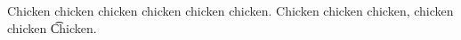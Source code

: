 Chicken chicken chicken chicken chicken chicken. Chicken chicken chicken, chicken chicken \t{Chicken}.